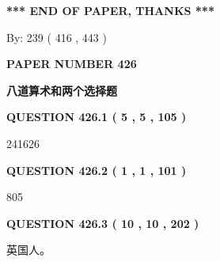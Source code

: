 \documentclass{ctexart}
\begin{document}
   
 \vspace{0.2in}
 
   
   
   
   
\vspace{1.0in} 
{\textbf{\large{ *** END OF PAPER, THANKS *** }}} 
   
   
\hspace{1.0in} By: 
 239 ( 416 ,  443 )
   
   
   
   
\newpage 
\setcounter{page}{ 
   426001 } 
   
   
   
   
 {\textbf{ \Large{ PAPER NUMBER  426  }}}
   
   
\vspace{0.2in}
   
   
   
   
   
   
 \vspace{0.2in}
{\LARGE {\textbf{ 八道算术和两个选择题}}}
   
   
  
\vspace{0.2in}
  
{\textbf{\Large{QUESTION
426.1 
 ( 5 , 5 , 105 )
}}}
  
  
 
 
\noindent{}

241626
 
 
  
\vspace{0.2in}
  
{\textbf{\Large{QUESTION
426.2 
 ( 1 , 1 , 101 )
}}}
  
  
 
 
\noindent{}

805
 
 
  
\vspace{0.2in}
  
{\textbf{\Large{QUESTION
426.3 
 ( 10 , 10 , 202 )
}}}
  
  
 
 
\noindent{}
 
 
英国人。
 
\end{document}
